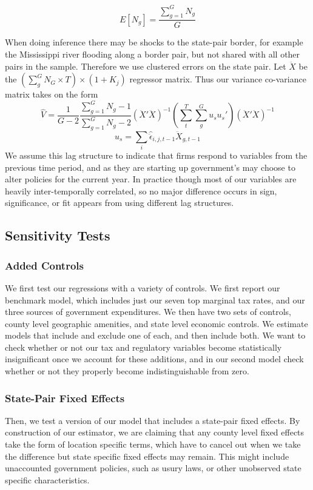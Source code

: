 \begin{equation}
E[N_{g}] = \frac{\sum_{g=1}^{G}N_{g}}{G}
\end{equation}

When doing inference there may be shocks to the state-pair border, for example the Mississippi river flooding along a border pair, but not shared with all other pairs in the sample. Therefore we use clustered errors on the state pair. Let $\ddot X$ be the $(\sum_{g}^{G}N_{G} \times T) \times (1+K_{j}) $ regressor matrix. Thus our variance co-variance matrix takes on the form
\begin{equation}\label{var}
\hat V =\frac{1}{G-2}\frac{\sum_{g=1}^{G}N_{g}-1}{\sum_{g=1}^{G}N_{g}-2}(\ddot X'\ddot X)^{-1}(\sum_{t}^{T}\sum_{g}^{G}u_{s}u_{s}')(\ddot X'\ddot X)^{-1}
\end{equation}
\begin{equation}\label{error}
u_{s} = \sum_{i}\hat \ddot \epsilon_{i,j,t-1}\ddot X_{g,t-1}
\end{equation}
We assume this lag structure to indicate that firms respond to variables from the previous time period, and as they are starting up government's may choose to alter policies for the current year. In practice though most of our variables are heavily inter-temporally correlated, so no major difference occurs in sign, significance, or fit appears from using different lag structures.

\subsection{Sensitivity Tests}

\subsubsection{Added Controls}

We first test our regressions with a variety of controls. We first report our benchmark model, which includes just our seven top marginal tax rates, and our three sources of government expenditures. We then have two sets of controls, county level geographic amenities, and state level economic controls. We estimate models that include and exclude one of each, and then include both. We want to check whether or not our tax and regulatory variables become statistically insignificant once we account for these additions, and in our second model check whether or not they properly become indistinguishable from zero. 

\subsubsection{State-Pair Fixed Effects}
Then, we test a version of our model that includes a state-pair fixed effects. By construction of our estimator, we are claiming that any county level fixed effects take the form of location specific terms, which have to cancel out when we take the difference but state specific fixed effects may remain. This might include unaccounted government policies, such as usury laws, or other unobserved state specific characteristics.

